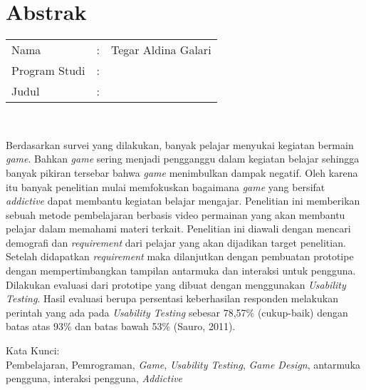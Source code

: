 %
%
%

\chapter*{Abstrak}

\vspace*{0.2cm}

\noindent \begin{tabular}{l l p{10cm}}
	Nama&: & Tegar Aldina Galari \\
	Program Studi&: & \program \\
	Judul&: & \judul \\
\end{tabular} \\ 

\vspace*{0.5cm}

\noindent 
Berdasarkan survei yang dilakukan, banyak pelajar menyukai kegiatan bermain \textit{game}. Bahkan \textit{game} sering menjadi pengganggu dalam kegiatan belajar sehingga banyak pikiran tersebar bahwa \textit{game} menimbulkan dampak negatif. Oleh karena itu banyak penelitian mulai memfokuskan bagaimana \textit{game} yang bersifat \textit{addictive} dapat membantu kegiatan belajar mengajar. Penelitian ini memberikan sebuah metode pembelajaran berbasis video permainan yang akan membantu pelajar dalam memahami materi terkait. Penelitian ini diawali dengan mencari demografi dan \textit{requirement} dari pelajar yang akan dijadikan target penelitian. Setelah didapatkan \textit{requirement} maka dilanjutkan dengan pembuatan prototipe dengan mempertimbangkan tampilan antarmuka dan interaksi untuk pengguna. Dilakukan evaluasi dari prototipe yang dibuat dengan menggunakan \textit{Usability Testing}. Hasil evaluasi berupa persentasi keberhasilan responden melakukan perintah yang ada pada \textit{Usability Testing} sebesar 78,57\% (cukup-baik) dengan batas atas 93\% dan batas bawah 53\% (Sauro, 2011).

\vspace*{0.2cm}

\noindent Kata Kunci: \\ 
\noindent Pembelajaran, Pemrograman, \textit{Game}, \textit{Usability Testing}, \textit{Game Design}, antarmuka pengguna, interaksi pengguna, \textit{Addictive}\\ 

\newpage